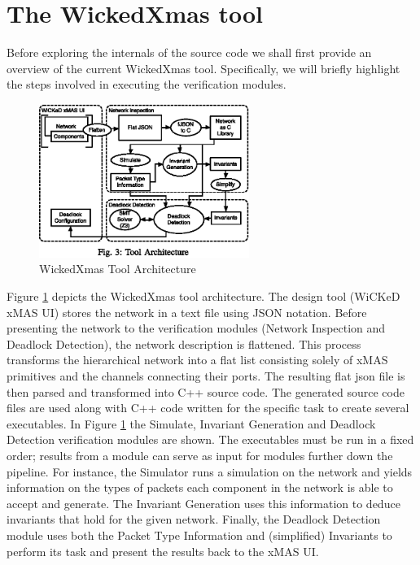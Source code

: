 \documentclass[a4paper,11pt]{article}
\begin{document}
\tableofcontents

\newpage

\section{The WickedXmas tool}


Before exploring the internals of the source code we shall first provide an overview
of the current WickedXmas tool. Specifically, we will briefly highlight the steps involved in
executing the verification modules.

\begin{figure}[h]
  \includegraphics[height=5cm]{wickedxmas-arch.eps}
  \caption{WickedXmas Tool Architecture}
  \label{fig:wickedxmas-arch}
\end{figure}

Figure \ref{fig:wickedxmas-arch}\cite[p.~3]{13_toolxmas} depicts the WickedXmas tool architecture.
The design tool (WiCKeD xMAS UI) stores the network in a text file using JSON notation. Before
presenting the network to the verification modules (Network Inspection and Deadlock Detection),
the network description is flattened. This process transforms the hierarchical network into
a flat list consisting solely of xMAS primitives and the channels connecting their ports. The resulting
flat json file is then parsed and transformed into C++ source code. The generated source code files are
used along with C++ code written for the specific task to create several executables. In Figure
\ref{fig:wickedxmas-arch} the Simulate, Invariant Generation and Deadlock Detection verification modules
are shown. The executables must be run in a fixed order; results from a module can serve as input for modules further down
the pipeline. For instance, the Simulator runs a simulation on the network and yields information on the
types of packets each component in the network is able to accept and generate. The Invariant Generation
uses this information to deduce invariants that hold for the given network. Finally, the Deadlock Detection
module uses both the Packet Type Information and (simplified) Invariants to perform its task and present
the results back to the xMAS UI.
\end{document}
